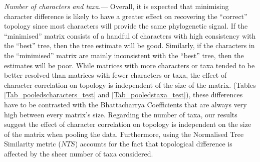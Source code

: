 \documentclass[12pt,letterpaper]{article}
\renewcommand{\subsubsection}[1]{%
\vspace{2ex}
\noindent
\textit{#1.}---}
\begin{document}
\subsubsection{Number of characters and taxa}
Overall, it is expected that minimising character difference %
 is likely to have a greater effect on recovering the ``correct'' topology since most characters will provide the same phylogenetic signal. %
If the ``minimised'' matrix consists of a handful of characters with high consistency with the ``best'' tree, then the tree estimate will be good.
Similarly, if the characters in the ``minimised'' matrix are mainly inconsistent with the ``best'' tree, then the estimates will be poor.
While matrices with more characters or taxa tended to be better resolved than matrices with fewer characters or taxa, the effect of character correlation on topology is independent of the size of the matrix. (Tables \ref{Tab_pooledscharacters_test} and \ref{Tab_pooledstaxa_test}), %
these differences have to be contrasted with the Bhattacharrya Coefficients that are always very high between every matrix's size.
Regarding the number of taxa, our results suggest the effect of character correlation on topology is independent on the size of the matrix when pooling the data. %
Furthermore, using the Normalised Tree Similarity metric ($NTS$) accounts for the fact that topological difference is affected by the sheer number of taxa considered.%
\end{document}
